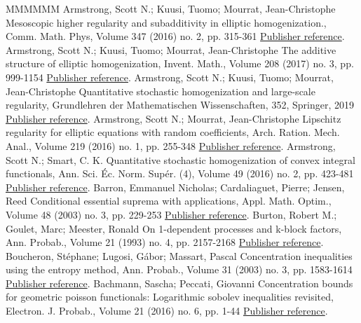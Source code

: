\documentclass[11pt]{article}
\theoremstyle{definition}
\numberwithin{equation}{section}
\numberwithin{figure}{section}
\numberwithin{table}{section}
\begin{document}
\begin{thebibliography}{MMMMMM}
 Armstrong, Scott N.; Kuusi, Tuomo; Mourrat, Jean-Christophe Mesoscopic higher regularity and subadditivity in elliptic homogenization., Comm. Math. Phys, Volume 347 (2016) no. 2, pp. 315-361 \href{https://ahl.centre-mersenne.org/item/AHL_2020__3__825_0/#AKM1}{Publisher reference}.
 Armstrong, Scott N.; Kuusi, Tuomo; Mourrat, Jean-Christophe The additive structure of elliptic homogenization, Invent. Math., Volume 208 (2017) no. 3, pp. 999-1154 \href{https://ahl.centre-mersenne.org/item/AHL_2020__3__825_0/#AKM2}{Publisher reference}.
 Armstrong, Scott N.; Kuusi, Tuomo; Mourrat, Jean-Christophe Quantitative stochastic homogenization and large-scale regularity, Grundlehren der Mathematischen Wissenschaften, 352, Springer, 2019 \href{https://ahl.centre-mersenne.org/item/AHL_2020__3__825_0/#AKM-book}{Publisher reference}.
 Armstrong, Scott N.; Mourrat, Jean-Christophe Lipschitz regularity for elliptic equations with random coefficients, Arch. Ration. Mech. Anal., Volume 219 (2016) no. 1, pp. 255-348 \href{https://ahl.centre-mersenne.org/item/AHL_2020__3__825_0/#Armstrong-Mourrat-16}{Publisher reference}.
 Armstrong, Scott N.; Smart, C. K. Quantitative stochastic homogenization of convex integral functionals, Ann. Sci. Éc. Norm. Supér. (4), Volume 49 (2016) no. 2, pp. 423-481 \href{https://ahl.centre-mersenne.org/item/AHL_2020__3__825_0/#Armstrong-Smart-16}{Publisher reference}.
 Barron, Emmanuel Nicholas; Cardaliaguet, Pierre; Jensen, Reed Conditional essential suprema with applications, Appl. Math. Optim., Volume 48 (2003) no. 3, pp. 229-253 \href{https://ahl.centre-mersenne.org/item/AHL_2020__3__825_0/#Barron}{Publisher reference}.
 Burton, Robert M.; Goulet, Marc; Meester, Ronald On 1-dependent processes and k-block factors, Ann. Probab., Volume 21 (1993) no. 4, pp. 2157-2168 \href{https://ahl.centre-mersenne.org/item/AHL_2020__3__825_0/#Burton-Goulet-Meester-93}{Publisher reference}.
 Boucheron, Stéphane; Lugosi, Gábor; Massart, Pascal Concentration inequalities using the entropy method, Ann. Probab., Volume 31 (2003) no. 3, pp. 1583-1614 \href{https://ahl.centre-mersenne.org/item/AHL_2020__3__825_0/#BLM-03}{Publisher reference}.
 Bachmann, Sascha; Peccati, Giovanni Concentration bounds for geometric poisson functionals: Logarithmic sobolev inequalities revisited, Electron. J. Probab., Volume 21 (2016) no. 6, pp. 1-44 \href{https://ahl.centre-mersenne.org/item/AHL_2020__3__825_0/#BachPec}{Publisher reference}.

\end{thebibliography}
\end{document}
